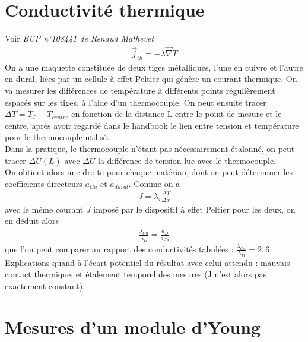 \documentclass[12pt,prb,aps,epsf]{article}
\begin{document}
\section{Conductivité thermique}
Voir \textit{BUP n°108441 de Renaud Mathevet}
\begin{eqnarray}
\vec{j}_{th} = -\lambda \vec{\nabla}T
\end{eqnarray}
On a une maquette constituée de deux tiges métalliques, l'une en cuivre et l'autre en dural, liées par un cellule à effet Peltier qui génère un courant thermique. On va mesurer les différences de température à différents points régulièrement espacés sur les tiges, à l'aide d'un thermocouple. On peut ensuite tracer $\Delta T = T_{L}-T_{centre}$ en fonction de la distance L entre le point de mesure et le centre, après avoir regardé dans le handbook le lien entre tension et température pour le thermocouple utilisé. \\
Dans la pratique, le thermocouple n'étant pas nécessairement étalonné, on peut tracer $\Delta U(L)$ avec $\Delta U$ la différence de tension lue avec le thermocouple.\\
On obtient alors une droite pour chaque matériau, dont on peut déterminer les coefficients directeurs $a_{Cu}$ et $a_{dural}$. Comme on a 
\begin{eqnarray}
J = \lambda_i \frac{\Delta T}{\Delta x}
\end{eqnarray} 
avec le même courant $J$ imposé par le dispositif à effet Peltier pour les deux, on en déduit alors 
\begin{eqnarray}
\frac{\lambda_{Cu}}{\lambda_{D}} = \frac{a_D}{a_{Cu}}
\end{eqnarray}
que l'on peut comparer au rapport des conductivités tabulées : $\frac{\lambda_{Cu}}{\lambda_D} = 2,6$\\

Explications quand à l'écart potentiel du résultat avec celui attendu : mauvais contact thermique, et étalement temporel des mesures (J n'est alors pas exactement constant).

\section{Mesures d'un module d'Young}
\end{document}
